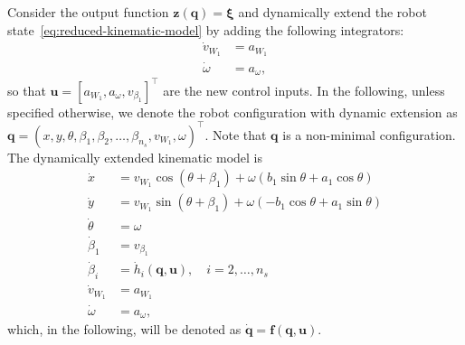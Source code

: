 Consider the output function $\bm{z}(\bm{q})=\bm{\xi}$ and dynamically extend the robot state~\eqref{eq:reduced-kinematic-model} by adding the following integrators:
\begin{subequations}
    \begin{align*}
        \dot{v}_{W_1} &= a_{W_1} \\
        \dot{\omega} &= a_{\omega},
    \end{align*}
\end{subequations}
so that $\bm{u} = \left[ a_{W_1}, a_{\omega}, v_{\beta_1} \right]^\top $ are the new control inputs. In the following, unless specified otherwise, we denote the robot configuration with dynamic extension as $\bm{q} = (x, y, \theta, \beta_1, \beta_2, \dots, \beta_{n_s}, v_{W_1}, \omega)^\top$. Note that $\bm{q}$ is a non-minimal configuration. The dynamically extended kinematic model is
\begin{equation}
\label{eq:dynamically-extended-kinematic-model}
\begin{split}
    \dot{x} &= v_{W_1} \cos(\theta + \beta_1) + \omega (b_1 \sin\theta + a_1 \cos\theta) \\
    \dot{y} &= v_{W_1} \sin(\theta + \beta_1) + \omega (-b_1 \cos\theta + a_1 \sin\theta) \\
    \dot{\theta} &= \omega \\
    \dot{\beta}_1 &= v_{\beta_1} \\
    \dot{\beta}_i &= \dot{h}_i(\bm{q}, \bm{u}), \quad i = 2, \dots, n_s \\
    \dot{v}_{W_1} &= a_{{W_1}} \\
    \dot{\omega} &= a_{\omega},
\end{split}
\end{equation}
which, in the following, will be denoted as $\dot{\bm{q}} = \bm{f}(\bm{q}, \bm{u})$.

